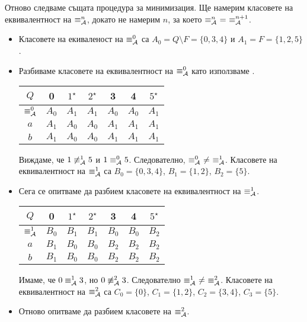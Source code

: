   {\scriptsize
  \begin{hint}
    Отново следваме същата процедура за минимизация.
    Ще намерим класовете на еквивалентност на $\equiv^n_{\mathcal{A}}$,
    докато не намерим $n$, за което $\equiv^n_\A\ =\ \equiv^{n+1}_\A$.
  \begin{itemize}
  \item
    Класовете на екиваленост на $\equiv^0_{\mathcal{A}}$ са 
    $A_0 = Q\setminus F = \{0,3,4\}$ и $A_1 = F = \{1,2,5\}$.
  \item
    Разбиваме класовете на еквивалентност на $\equiv^0_{\mathcal{A}}$ като използваме .
    
    \begin{tabular}{|c|c|c|c|c|c|c|}
      \hline
      $Q$ & 0 & $1^\star$ & $2^\star$ & 3 & 4 & $5^\star$ \\
      \hline
      \hline
      $\equiv^0_{\mathcal{A}}$ & $A_0$ & $A_1$ & $A_1$ & $A_0$ & $A_0$ & $A_1$\\
      \hline
      $a$ & $A_1$& $A_0$ & $A_0$ & $A_1$ & $A_1$ & $A_1$\\
      \hline
      $b$ & $A_1$& $A_0$ & $A_0$ & $A_1$ & $A_1$ & $A_1$\\
      \hline
    \end{tabular}
    
    Виждаме, че $1 \not\equiv^1_{\mathcal{A}} 5$ и $1 \equiv^0_{\mathcal{A}} 5$.
    Следователно, $\equiv^0_{\mathcal{A}}\ \neq\ \equiv^1_{\mathcal{A}}$.
    Класовете на еквивалентност на $\equiv^1_{\mathcal{A}}$ са 
    $B_0 = \{0,3,4\}$, $B_1 = \{1,2\}$, $B_2 = \{5\}$.
  \item
    Сега се опитваме да разбием класовете на еквивалентност на $\equiv^1_{\mathcal{A}}$.

    \begin{tabular}{|c|c|c|c|c|c|c|}
      \hline
      $Q$ & 0 & $1^\star$ & $2^\star$ & 3 & 4 & $5^\star$ \\
      \hline
      \hline
      $\equiv^1_{\mathcal{A}}$ & $B_0$ & $B_1$ & $B_1$ & $B_0$ & $B_0$ & $B_2$\\
      \hline
      $a$ & $B_1$ & $B_0$ & $B_0$ & $B_2$ & $B_2$ & $B_2$\\
      \hline
      $b$ & $B_1$ & $B_0$ & $B_0$ & $B_2$ & $B_2$ & $B_2$\\
      \hline
    \end{tabular}
    
    Имаме, че $0 \equiv^1_{\mathcal{A}} 3$, но $0 \not\equiv^2_{\mathcal{A}} 3$. Следователно $\equiv^1_{\mathcal{A}}\ \neq\ \equiv^2_{\mathcal{A}}$.
    Класовете на еквивалентност на $\equiv^2_{\mathcal{A}}$ са 
    $C_0 = \{0\}$, $C_1 = \{1,2\}$, $C_2 = \{3,4\}$, $C_3 = \{5\}$.
  \item
    Отново опитваме да разбием класовете на $\equiv^2_{\mathcal{A}}$.


\end{itemize}
\end{hint}}
